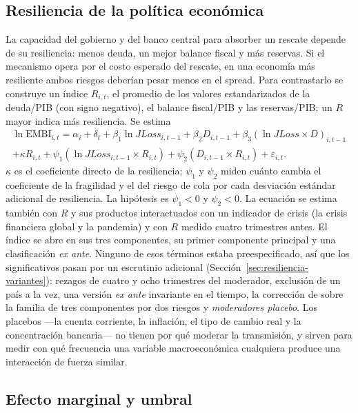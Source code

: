 \subsection{Resiliencia de la política económica}
\label{sec:est-resiliencia}

La capacidad del gobierno y del banco central para absorber un rescate depende de su resiliencia: menos deuda, un mejor balance fiscal y más reservas. Si el mecanismo opera por el costo esperado del rescate, en una economía más resiliente ambos riesgos deberían pesar menos en el spread. Para contrastarlo se construye un índice $R_{i,t}$, el promedio de los valores estandarizados de la deuda/PIB (con signo negativo), el balance fiscal/PIB y las reservas/PIB; un $R$ mayor indica más resiliencia. Se estima
\begin{multline}
\ln\mathrm{EMBI}_{i,t}=\alpha_i+\delta_t+\beta_1\ln JLoss_{i,t-1}+\beta_2D_{i,t-1}+\beta_3(\ln JLoss\times D)_{i,t-1}\\
+\kappa R_{i,t}+\psi_1(\ln JLoss_{i,t-1}\times R_{i,t})+\psi_2(D_{i,t-1}\times R_{i,t})+\varepsilon_{i,t}.
\label{eq:resiliencia}
\end{multline}
$\kappa$ es el coeficiente directo de la resiliencia; $\psi_1$ y $\psi_2$ miden cuánto cambia el coeficiente de la fragilidad y el del riesgo de cola por cada desviación estándar adicional de resiliencia. La hipótesis es $\psi_1<0$ y $\psi_2<0$. La ecuación se estima también con $R$ y sus productos interactuados con un indicador de crisis (la crisis financiera global y la pandemia) y con $R$ medido cuatro trimestres antes. El índice se abre en sus tres componentes, su primer componente principal y una clasificación \textit{ex ante}. Ninguno de esos términos estaba preespecificado, así que los significativos pasan por un escrutinio adicional (Sección~\ref{sec:resiliencia-variantes}): rezagos de cuatro y ocho trimestres del moderador, exclusión de un país a la vez, una versión \textit{ex ante} invariante en el tiempo, la corrección de \citet{Holm1979} sobre la familia de tres componentes por dos riesgos y \emph{moderadores placebo}. Los placebos ---la cuenta corriente, la inflación, el tipo de cambio real y la concentración bancaria--- no tienen por qué moderar la transmisión, y sirven para medir con qué frecuencia una variable macroeconómica cualquiera produce una interacción de fuerza similar.

\subsection{Efecto marginal y umbral}
\label{sec:est-marginal}

